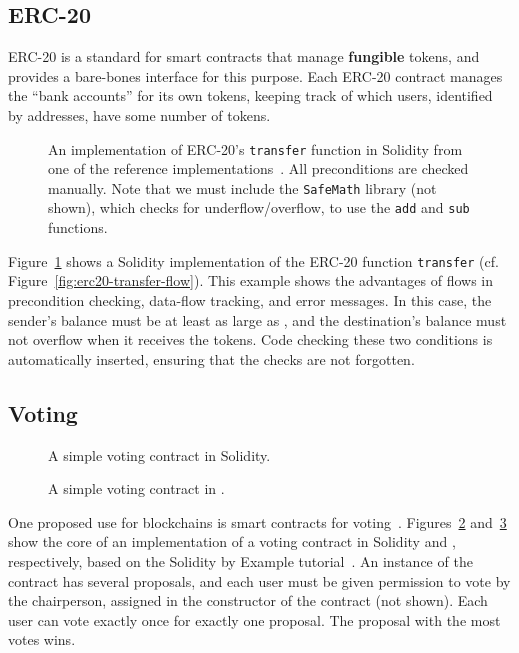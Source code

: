 \documentclass[nonacm, dvipsnames, usenames, sigconf]{acmart}
\begin{document}
\subsection{ERC-20}\label{sec:erc20-impl}
ERC-20 is a standard for smart contracts that manage \textbf{fungible} tokens, and provides a bare-bones interface for this purpose.
Each ERC-20 contract manages the ``bank accounts'' for its own tokens, keeping track of which users, identified by addresses, have some number of tokens.
\begin{figure}
    \centering
    
    \caption{An implementation of ERC-20's \lstinline{transfer} function in Solidity from one of the reference implementations~\cite{erc20Consensys}.
        All preconditions are checked manually.
        Note that we must include the \lstinline{SafeMath} library (not shown), which checks for underflow/overflow, to use the \lstinline{add} and \lstinline{sub} functions.}
    \label{fig:erc20-transfer-sol}
\end{figure}
Figure~\ref{fig:erc20-transfer-sol} shows a Solidity implementation of the ERC-20 function \lstinline{transfer} (cf. Figure~\ref{fig:erc20-transfer-flow}).
This example shows the advantages of flows in precondition checking, data-flow tracking, and error messages.
In this case, the sender's balance must be at least as large as , and the destination's balance must not overflow when it receives the tokens.
Code checking these two conditions is automatically inserted, ensuring that the checks are not forgotten.

\subsection{Voting}\label{sec:voting-impl}
\begin{figure}
    \centering
    
    \caption{A simple voting contract in Solidity.}
    \label{fig:voting-impl-sol}
\end{figure}%
\begin{figure}
    \centering
    
    \caption{A simple voting contract in \langName.}
    \label{fig:voting-impl-flow}
\end{figure}
One proposed use for blockchains is smart contracts for voting~\cite{Elsden18:Making}.
Figures~\ref{fig:voting-impl-sol} and~\ref{fig:voting-impl-flow} show the core of an implementation of a voting contract in Solidity and \langName, respectively, based on the Solidity by Example tutorial~\cite{solidityByExample}.
An instance of the contract has several proposals, and each user must be given permission to vote by the chairperson, assigned in the constructor of the contract (not shown).
Each user can vote exactly once for exactly one proposal.
The proposal with the most votes wins.
\end{document}
